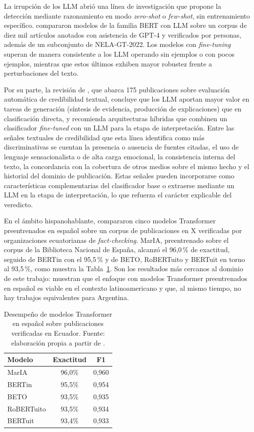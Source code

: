 La irrupción de los LLM abrió una línea de investigación que propone la detección mediante razonamiento en modo \textit{zero-shot} o \textit{few-shot}, sin entrenamiento específico. \textcite{RazaEtAl2024} compararon modelos de la familia BERT con LLM sobre un corpus de diez mil artículos anotados con asistencia de GPT-4 y verificados por personas, además de un subconjunto de NELA-GT-2022. Los modelos con \textit{fine-tuning} superan de manera consistente a los LLM operando sin ejemplos o con pocos ejemplos, mientras que estos últimos exhiben mayor robustez frente a perturbaciones del texto.

Por su parte, la revisión de \textcite{SrbaEtAl2025}, que abarca 175 publicaciones sobre evaluación automática de credibilidad textual, concluye que los LLM aportan mayor valor en tareas de generación (síntesis de evidencia, producción de explicaciones) que en clasificación directa, y recomienda arquitecturas híbridas que combinen un clasificador \textit{fine-tuned} con un LLM para la etapa de interpretación. Entre las señales textuales de credibilidad que esta línea identifica como más discriminativas se cuentan la presencia o ausencia de fuentes citadas, el uso de lenguaje sensacionalista o de alta carga emocional, la consistencia interna del texto, la concordancia con la cobertura de otros medios sobre el mismo hecho y el historial del dominio de publicación. Estas señales pueden incorporarse como características complementarias del clasificador base o extraerse mediante un LLM en la etapa de interpretación, lo que refuerza el carácter explicable del veredicto.

En el ámbito hispanohablante, \textcite{ToapantaEtAl2024} compararon cinco modelos Transformer preentrenados en español sobre un corpus de publicaciones en X verificadas por organizaciones ecuatorianas de \textit{fact-checking}. MarIA, preentrenado sobre el corpus de la Biblioteca Nacional de España, alcanzó el 96,0\,\% de exactitud, seguido de BERTin con el 95,5\,\% y de BETO, RoBERTuito y BERTuit en torno al 93,5\,\%, como muestra la Tabla~\ref{tab:toapanta}. Son los resultados más cercanos al dominio de este trabajo: muestran que el enfoque con modelos Transformer preentrenados en español es viable en el contexto latinoamericano y que, al mismo tiempo, no hay trabajos equivalentes para Argentina.

\begin{table}[t]
  \centering
  \caption{Desempeño de modelos Transformer en español sobre publicaciones verificadas en Ecuador. Fuente: elaboración propia a partir de \textcite{ToapantaEtAl2024}.}
  \label{tab:toapanta}
  \begin{tabular}{l c c}
    \hline
    \textbf{Modelo} & \textbf{Exactitud} & \textbf{F1} \\
    \hline
    MarIA & 96,0\% & 0,960 \\
    BERTin & 95,5\% & 0,954 \\
    BETO & 93,5\% & 0,935 \\
    RoBERTuito & 93,5\% & 0,934 \\
    BERTuit & 93,4\% & 0,933 \\
    \hline
  \end{tabular}
\end{table}

